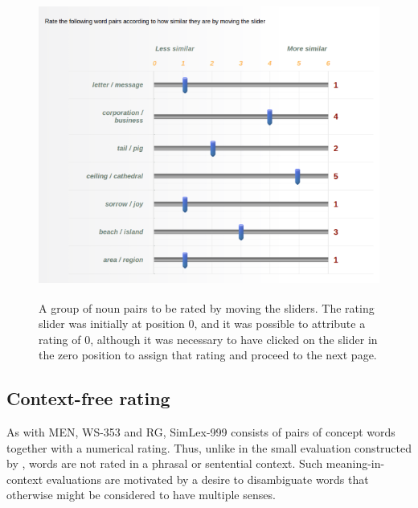 \begin{figure}[ht]  


    \includegraphics[height=10cm]{Chapter_2/screenshot2_CL}

  \caption{\label{fig3} A group of noun pairs to be rated by moving the sliders. The rating slider was initially at position 0, and it was possible to attribute a rating of 0, although it was necessary to have clicked on the slider in the zero position to assign that rating and proceed to the next page.}

\end{figure} 



\vspace{2cm}
\subsection{Context-free rating}

As with MEN, WS-353 and RG, SimLex-999 consists of pairs of concept words together with a numerical rating. Thus, unlike in the small evaluation constructed by \cite{huang2012improving}, words are not rated in a phrasal or sentential context. Such meaning-in-context evaluations are motivated by a desire to disambiguate words that otherwise might be considered to have multiple senses.

